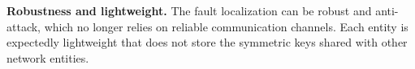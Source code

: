 \noindent\textbf{Robustness and lightweight.} The fault localization can be robust and anti-attack, which no longer relies on reliable communication channels. Each entity is expectedly lightweight that does not store the symmetric keys shared with other network entities.

